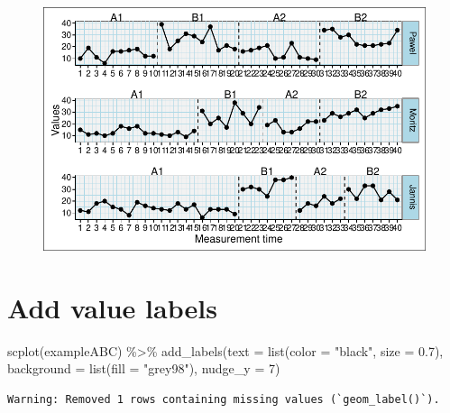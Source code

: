 \documentclass[
  letterpaper,
  DIV=11,
  numbers=noendperiod]{scrreprt}
\newenvironment{Shaded}{\begin{snugshade}}{\end{snugshade}}
\newcommand{\AttributeTok}[1]{\textcolor[rgb]{0.40,0.45,0.13}{#1}}
\newcommand{\DecValTok}[1]{\textcolor[rgb]{0.68,0.00,0.00}{#1}}
\newcommand{\FloatTok}[1]{\textcolor[rgb]{0.68,0.00,0.00}{#1}}
\newcommand{\FunctionTok}[1]{\textcolor[rgb]{0.28,0.35,0.67}{#1}}
\newcommand{\NormalTok}[1]{\textcolor[rgb]{0.00,0.23,0.31}{#1}}
\newcommand{\SpecialCharTok}[1]{\textcolor[rgb]{0.37,0.37,0.37}{#1}}
\newcommand{\StringTok}[1]{\textcolor[rgb]{0.13,0.47,0.30}{#1}}
\begin{document}
\begin{figure}[H]

{\centering \includegraphics{./ch_scplot_files/figure-pdf/casenames2-1.pdf}

}

\end{figure}

\hypertarget{add-value-labels}{%
\section{Add value labels}\label{add-value-labels}}

\begin{Shaded}
\begin{Highlighting}[]
\FunctionTok{scplot}\NormalTok{(exampleABC) }\SpecialCharTok{\%\textgreater{}\%} 
  \FunctionTok{add\_labels}\NormalTok{(}\AttributeTok{text =} \FunctionTok{list}\NormalTok{(}\AttributeTok{color =} \StringTok{"black"}\NormalTok{, }\AttributeTok{size =} \FloatTok{0.7}\NormalTok{), }
             \AttributeTok{background =} \FunctionTok{list}\NormalTok{(}\AttributeTok{fill =} \StringTok{"grey98"}\NormalTok{), }\AttributeTok{nudge\_y =} \DecValTok{7}\NormalTok{)}
\end{Highlighting}
\end{Shaded}

\begin{verbatim}
Warning: Removed 1 rows containing missing values (`geom_label()`).
\end{verbatim}
\end{document}
